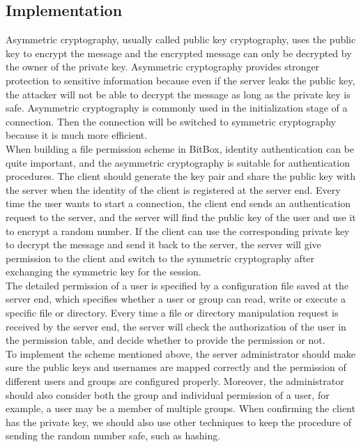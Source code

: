 \documentclass[a4paper,10pt,titlepage,twocolumn]{article}
\begin{document}
    \subsection{Implementation}
    Asymmetric cryptography, usually called public key cryptography, uses the public key to encrypt the message and the encrypted message can only be decrypted by the owner of the private key. Asymmetric cryptography provides stronger protection to sensitive information because even if the server leaks the public key, the attacker will not be able to decrypt the message as long as the private key is safe. Asymmetric cryptography is commonly used in the initialization stage of a connection. Then the connection will be switched to symmetric cryptography because it is much more efficient.
\\When building a file permission scheme in BitBox, identity authentication can be quite important, and the asymmetric cryptography is suitable for authentication procedures. The client should generate the key pair and share the public key with the server when the identity of the client is registered at the server end. Every time the user wants to start a connection, the client end sends an authentication request to the server, and the server will find the public key of the user and use it to encrypt a random number. If the client can use the corresponding private key to decrypt the message and send it back to the server, the server will give permission to the client and switch to the symmetric cryptography after exchanging the symmetric key for the session. 
\\The detailed permission of a user is specified by a configuration file saved at the server end, which specifies whether a user or group can read, write or execute a specific file or directory. Every time a file or directory manipulation request is received by the server end, the server will check the authorization of the user in the permission table, and decide whether to provide the permission or not.
\\To implement the scheme mentioned above, the server administrator should make sure the public keys and usernames are mapped correctly and the permission of different users and groups are configured properly. Moreover, the administrator should also consider both the group and individual permission of a user, for example, a user may be a member of multiple groups. When confirming the client has the private key, we should also use other techniques to keep the procedure of sending the random number safe, such as hashing.
\end{document}
